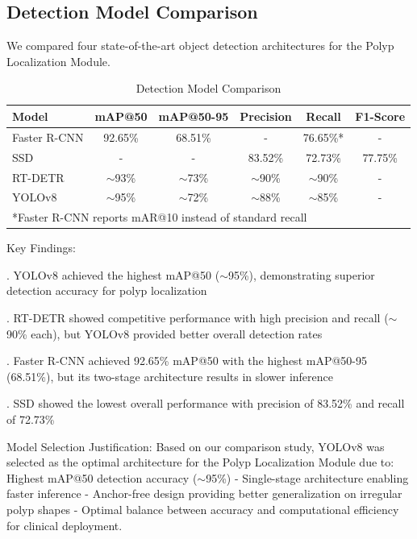 \documentclass[runningheads]{llncs}
\begin{document}
\subsection{Detection Model Comparison}
We compared four state-of-the-art object detection architectures for the Polyp Localization Module.

\begin{table}[H]
\caption{Detection Model Comparison}
\label{tab:comparison}
\centering
\begin{tabular}{lccccc}
\toprule
\textbf{Model} & \textbf{mAP@50} & \textbf{mAP@50-95} & \textbf{Precision} & \textbf{Recall} & \textbf{F1-Score} \\
\midrule
Faster R-CNN & 92.65\% & 68.51\% & - & 76.65\%* & - \\
SSD & - & - & 83.52\% & 72.73\% & 77.75\% \\
RT-DETR & $\sim$93\% & $\sim$73\% & $\sim$90\% & $\sim$90\% & - \\
YOLOv8 & $\sim$95\% & $\sim$72\% & $\sim$88\% & $\sim$85\% & - \\
\bottomrule
\multicolumn{6}{l}{*Faster R-CNN reports mAR@10 instead of standard recall}
\end{tabular}
\end{table}

Key Findings:

. YOLOv8 achieved the highest mAP@50 ($\sim$95\%), demonstrating superior detection accuracy for polyp localization

. RT-DETR showed competitive performance with high precision and recall ($\sim$90\% each), but YOLOv8 provided better overall detection rates

. Faster R-CNN achieved 92.65\% mAP@50 with the highest mAP@50-95 (68.51\%), but its two-stage architecture results in slower inference

. SSD showed the lowest overall performance with precision of 83.52\% and recall of 72.73\%

Model Selection Justification: Based on our comparison study, YOLOv8 was selected as the optimal architecture for the Polyp Localization Module due to: Highest mAP@50 detection accuracy ($\sim$95\%) - Single-stage architecture enabling faster inference - Anchor-free design providing better generalization on irregular polyp shapes - Optimal balance between accuracy and computational efficiency for clinical deployment.

\end{document}
